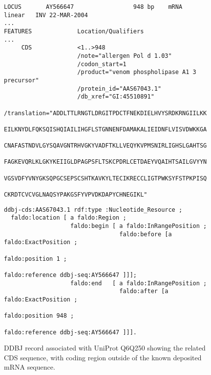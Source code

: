 \begin{figure}
\begin{shaded}
\small
\begin{verbatim}
LOCUS       AY566647                 948 bp    mRNA    linear   INV 22-MAR-2004
...
FEATURES             Location/Qualifiers
...
     CDS             <1..>948
                     /note="allergen Pol d 1.03"
                     /codon_start=1
                     /product="venom phospholipase A1 3 precursor"
                     /protein_id="AAS67043.1"
                     /db_xref="GI:45510891"
                     /translation="ADDLTTLRNGTLDRGITPDCTFNEKDIELHVYSRDKRNGIILKK
                     EILKNYDLFQKSQISHQIAILIHGFLSTGNNENFDAMAKALIEIDNFLVISVDWKKGA
                     CNAFASTNDVLGYSQAVGNTRHVGKYVADFTKLLVEQYKVPMSNIRLIGHSLGAHTSG
                     FAGKEVQRLKLGKYKEIIGLDPAGPSFLTSKCPDRLCETDAEYVQAIHTSAILGVYYN
                     VGSVDFYVNYGKSQPGCSEPSCSHTKAVKYLTECIKRECCLIGTPWKSYFSTPKPISQ
                     CKRDTCVCVGLNAQSYPAKGSFYVPVDKDAPYCHNEGIKL"
\end{verbatim}
\begin{verbatim}
ddbj-cds:AAS67043.1 rdf:type :Nucleotide_Resource ;
  faldo:location [ a faldo:Region ;
                   faldo:begin [ a faldo:InRangePosition ;
                                 faldo:before [a faldo:ExactPosition ;
                                              faldo:position 1 ;
                                              faldo:reference ddbj-seq:AY566647 ]]];
                   faldo:end   [ a faldo:InRangePosition ;
                                 faldo:after [a faldo:ExactPosition ;
                                              faldo:position 948 ;
                                              faldo:reference ddbj-seq:AY566647 ]]].
\end{verbatim}
\end{shaded}
\caption{DDBJ record associated with UniProt Q6Q250 showing the related CDS sequence, with coding region outside of the known deposited mRNA sequence.}
\label{fig:DDBJ}
\end{figure}



